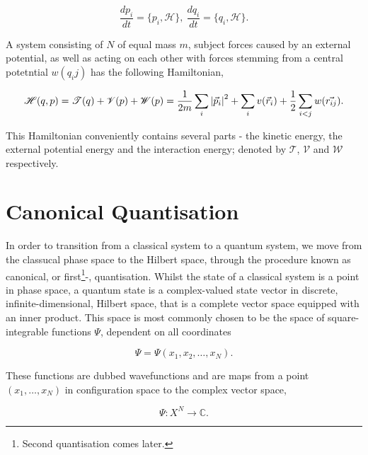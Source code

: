     \begin{equation}
        \frac{dp_i}{dt} = \{p_i, \mathscr{H}\}, \ \frac{dq_i}{dt} = \{q_i, \mathscr{H}\}.
    \end{equation}

    A system consisting of $N$ of equal mass $m$, subject forces caused by an external
    potential, as well as acting on each other with forces stemming from a central
    potetntial $w(q_ij)$ has the following Hamiltonian,

    \begin{equation}
        \mathscr{H}(q, p) = \mathscr{T}(q) + \mathscr{V}(p) + \mathscr{W}(p) 
            = \frac{1}{2m}\sum_{i} \abs{\vec{p}_i}^2 + \sum_{i} v(\vec{r}_i)
                + \frac{1}{2}\sum_{i<j} w(\vec{r_{ij}}).
    \end{equation}

    This Hamiltonian conveniently contains several parts - the kinetic energy, the
    external potential energy and the interaction energy; denoted by $\mathscr{T}$,
    $\mathscr{V}$ and $\mathscr{W}$ respectively.

\section{Canonical Quantisation}

    In order to transition from a classical system to a quantum system, we move from 
    the classucal phase space to the Hilbert space, through the procedure known as 
    canonical, or first\footnote{Second quantisation comes later.}-, quantisation.
    Whilst the state of a classical system is a point in phase space, a quantum state
    is a complex-valued state vector in discrete, infinite-dimensional, Hilbert space,
    that is a complete vector space equipped with an inner product. This space
    is most commonly chosen to be the space of square-integrable functions $\Psi$,
    dependent on all coordinates
    
    \begin{equation}
        \Psi = \Psi(x_1, x_2, \dots, x_N).
    \end{equation}
    
    These functions
    are dubbed wavefunctions and are maps from a point $(x_1, \dots, x_N)$ in
    configuration space to the complex vector space,

    \begin{equation}
        \Psi: X^N \to \mathds{C}.
    \end{equation}

